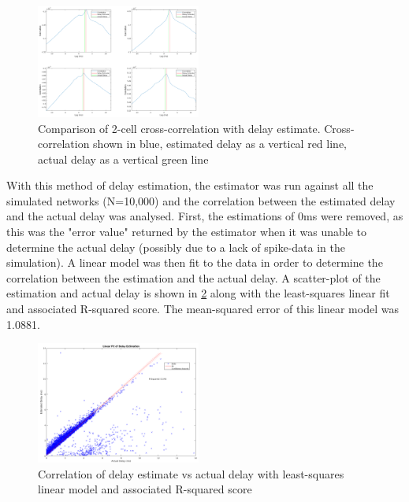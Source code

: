 \documentclass[letterpaper, 10 pt, conference]{ieeeconf}  %
\begin{document}
\begin{figure}[ht]
    \centering
    \includegraphics[width=0.48\textwidth]{2cell_Corr.png}
    \caption{Comparison of 2-cell cross-correlation with delay estimate. Cross-correlation shown in blue, estimated delay as a vertical red line, actual delay as a vertical green line}
    \label{fig:sample2CellCorrPlots}
\end{figure}

With this method of delay estimation, the estimator was run against all the simulated networks (N=10,000) and the correlation between the estimated delay and the actual delay was analysed. First, the estimations of 0ms were removed, as this was the "error value" returned by the estimator when it was unable to determine the actual delay (possibly due to a lack of spike-data in the simulation). A linear model was then fit to the data in order to determine the correlation between the estimation and the actual delay. A scatter-plot of the estimation and actual delay is shown in \ref{fig:2CellDelayLFit} along with the least-squares linear fit and associated R-squared score. The mean-squared error of this linear model was 1.0881.
\begin{figure}[ht]
    \centering
    \includegraphics[width=0.48\textwidth]{delayFit.png}
    \caption{Correlation of delay estimate vs actual delay with least-squares linear model and associated R-squared score}
    \label{fig:2CellDelayLFit}
\end{figure}
\end{document}
